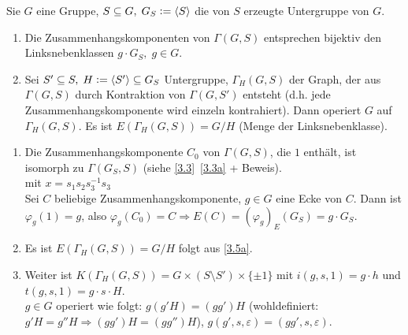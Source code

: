 \documentclass[a4paper, 10pt]{report}
\begin{document}
\begin{Prop} 
Sie $G$ eine Gruppe, $S \subseteq G,\; G_S \mathrel{\mathop:}= \langle S \rangle$ die von $S$
erzeugte Untergruppe von $G$.
\begin{enumerate}
  \item \label{3.5a}
  Die Zusammenhangskomponenten von $\Gamma(G,S)$ entsprechen bijektiv den
  Linksnebenklassen $g \cdot G_S, \; g \in G$.
  \item Sei $S' \subseteq S, \; H \mathrel{\mathop:}= \langle S' \rangle \subseteq G_S$
  Untergruppe, $\Gamma_H(G,S)$ der Graph, der aus $\Gamma(G,S)$ durch
  Kontraktion von $\Gamma(G,S')$ entsteht (d.h. jede Zusammenhangskomponente
  wird einzeln kontrahiert).
  Dann operiert $G$ auf $\Gamma_H(G,S)$.
  Es ist $E(\Gamma_H(G,S))=G/H$ (Menge der Linksnebenklasse).
\end{enumerate}
\end{Prop}

\begin{Bew}
\begin{enumerate}
  \item Die Zusammenhangskomponente $C_0$ von $\Gamma(G,S)$, die $1$ enthält,
  ist isomorph zu $\Gamma(G_S,S)$ (siehe \ref*{3.3}~\ref{3.3a} + Beweis).\\
  
  mit $x = s_1s_2s_3^{-1}s_3$\\
  Sei $C$ beliebige Zusammenhangskomponente, $g \in G$ eine Ecke von $C$.
  Dann ist $\varphi_g(1)=g$, also $\varphi_g(C_0) = C \Rightarrow E(C) = 
  (\varphi_g)_E(G_S) = g \cdot G_S$.
  \item Es ist $E(\Gamma_H(G,S))=G/H$ folgt aus \ref{3.5a}.\\
  \item Weiter ist $K(\Gamma_H(G,S)) = G \times (S \setminus S') \times
  \{\pm 1\}$ mit $i(g,s,1) = g \cdot h$ und $t(g,s,1)=g \cdot s \cdot
  H$.\\
  $g \in G$ operiert wie folgt: $g(g'H) = (gg')H$ (wohldefiniert: $g'H = g''H
  \Rightarrow (gg')H = (gg'')H$), $g(g',s,\varepsilon) = (gg', s , \varepsilon)$.
\end{enumerate}
\end{Bew}
\end{document}
